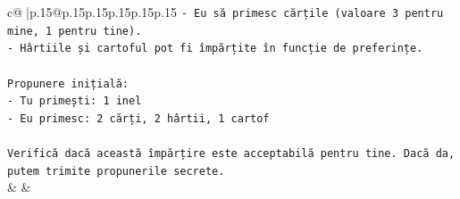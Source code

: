 \documentclass{article}
\begin{document}
{\begin{supertabular}{c@{$\;$}|p{.15\linewidth}@{}p{.15\linewidth}p{.15\linewidth}p{.15\linewidth}p{.15\linewidth}p{.15\linewidth}}
{{{\texttt{{-} Eu să primesc cărțile (valoare 3 pentru mine, 1 pentru tine).} \\
\texttt{{-} Hârtiile și cartoful pot fi împărțite în funcție de preferințe.} \\
\\ 
\texttt{Propunere inițială:} \\
\texttt{{-} Tu primești: 1 inel} \\
\texttt{{-} Eu primesc: 2 cărți, 2 hârtii, 1 cartof} \\
\\ 
\texttt{Verifică dacă această împărțire este acceptabilă pentru tine. Dacă da, putem trimite propunerile secrete.} \\
            }
        }
    }
    & & \\ \\


\end{supertabular}}
\end{document}
